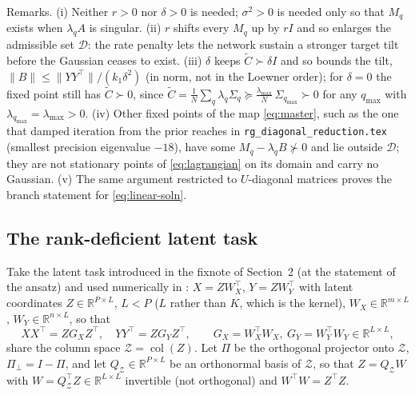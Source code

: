 \documentclass[11pt,a4paper]{article}
\newcommand{\R}{\mathbb R}
\newcommand{\Ct}{\tilde C}
\newcommand{\Z}{\mathcal Z}
\newcommand{\dom}{\mathcal D}
\begin{document}
Remarks. (i) Neither $r > 0$ nor $\delta > 0$ is needed; $\sigma^2 > 0$ is needed only so that $M_q$ exists when $\lambda_q A$ is singular. (ii) $r$ shifts every $M_q$ up by $r I$ and so enlarges the admissible set $\dom$: the rate penalty lets the network sustain a stronger target tilt before the Gaussian ceases to exist. (iii) $\delta$ keeps $\Ct \succ \delta I$ and so bounds the tilt, $\|B\| \le \|YY^\top\|/(k_1\delta^2)$ (in norm, not in the Loewner order); for $\delta = 0$ the fixed point still has $\Ct \succ 0$, since $\Ct = \frac1N\sum_q\lambda_q\Sigma_q \succeq \frac{\lambda_{\max}}{N}\,\Sigma_{q_{\max}} \succ 0$ for any $q_{\max}$ with $\lambda_{q_{\max}} = \lambda_{\max} > 0$. (iv) Other fixed points of the map \eqref{eq:master}, such as the one that damped iteration from the prior reaches in \texttt{rg\_diagonal\_reduction.tex} (smallest precision eigenvalue $-18$), have some $M_q - \lambda_q B \not\succ 0$ and lie outside $\dom$; they are not stationary points of \eqref{eq:lagrangian} on its domain and carry no Gaussian. (v) The same argument restricted to $U$-diagonal matrices proves the branch statement for \eqref{eq:linear-soln}.

\subsection{The rank-deficient latent task}
\label{sec:rank}
Take the latent task introduced in the fixnote of Section~2 (at the statement of the ansatz) and used numerically in : $X = ZW_X^\top$, $Y = ZW_Y^\top$ with latent coordinates $Z \in \R^{P\times L}$, $L < P$ ($L$ rather than $K$, which is the kernel), $W_X \in \R^{m\times L}$, $W_Y \in \R^{n\times L}$, so that
\begin{equation}
  XX^\top = Z G_X Z^\top,\quad YY^\top = Z G_Y Z^\top,\qquad G_X = W_X^\top W_X,\ G_Y = W_Y^\top W_Y \in \R^{L\times L},
\end{equation}
share the column space $\Z = \operatorname{col}(Z)$. Let $\Pi$ be the orthogonal projector onto $\Z$, $\Pi_\perp = I - \Pi$, and let $Q_\Z \in \R^{P\times L}$ be an orthonormal basis of $\Z$, so that $Z = Q_\Z W$ with $W = Q_\Z^\top Z \in \R^{L\times L}$ invertible (not orthogonal) and $W^\top W = Z^\top Z$.
\end{document}
